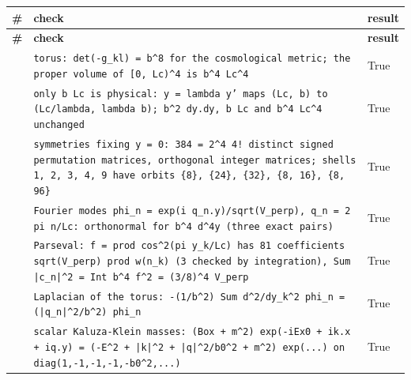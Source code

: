\documentclass[10pt,a4paper]{article}
\begin{document}
{\footnotesize
\begin{longtable}{>{\raggedright\arraybackslash}p{}>{\raggedright\arraybackslash}p{}>{\raggedright\arraybackslash}p{}}
\toprule
\textbf{\#} & \textbf{check} & \textbf{result} \\
\midrule\endfirsthead
\toprule
\textbf{\#} & \textbf{check} & \textbf{result} \\
\midrule\endhead
\endfoot
\bottomrule\endlastfoot
1 & \texttt{torus: det(-g\_\allowbreak{}kl) = b\textasciicircum{}8 for the cosmological metric; the proper volume of [0, Lc)\textasciicircum{}4 is b\textasciicircum{}4 Lc\textasciicircum{}4} & True \\
2 & \texttt{only b Lc is physical: y = lambda y' maps (Lc, b) to (Lc/\allowbreak{}lambda, lambda b); b\textasciicircum{}2 dy.dy, b Lc and b\textasciicircum{}4 Lc\textasciicircum{}4 unchanged} & True \\
3 & \texttt{symmetries fixing y = 0: 384 = 2\textasciicircum{}4 4! distinct signed permutation matrices, orthogonal integer matrices; shells 1, 2, 3, 4, 9 have orbits \{8\}, \{24\}, \{32\}, \{8, 16\}, \{8, 96\}} & True \\
4 & \texttt{Fourier modes phi\_\allowbreak{}n = exp(i q\_\allowbreak{}n.y)/\allowbreak{}sqrt(V\_\allowbreak{}perp), q\_\allowbreak{}n = 2 pi n/\allowbreak{}Lc: orthonormal for b\textasciicircum{}4 d\textasciicircum{}4y (three exact pairs)} & True \\
5 & \texttt{Parseval: f = prod cos\textasciicircum{}2(pi y\_\allowbreak{}k/\allowbreak{}Lc) has 81 coefficients sqrt(V\_\allowbreak{}perp) prod w(n\_\allowbreak{}k) (3 checked by integration), Sum |c\_\allowbreak{}n|\textasciicircum{}2 = Int b\textasciicircum{}4 f\textasciicircum{}2 = (3/\allowbreak{}8)\textasciicircum{}4 V\_\allowbreak{}perp} & True \\
6 & \texttt{Laplacian of the torus: -(1/\allowbreak{}b\textasciicircum{}2) Sum d\textasciicircum{}2/\allowbreak{}dy\_\allowbreak{}k\textasciicircum{}2 phi\_\allowbreak{}n = (|q\_\allowbreak{}n|\textasciicircum{}2/\allowbreak{}b\textasciicircum{}2) phi\_\allowbreak{}n} & True \\
7 & \texttt{scalar Kaluza-Klein masses: (Box + m\textasciicircum{}2) exp(-iEx0 + ik.x + iq.y) = (-E\textasciicircum{}2 + |k|\textasciicircum{}2 + |q|\textasciicircum{}2/\allowbreak{}b0\textasciicircum{}2 + m\textasciicircum{}2) exp(...) on diag(1,-1,-1,-1,-b0\textasciicircum{}2,...)} & True \\

\end{longtable}}
\end{document}
